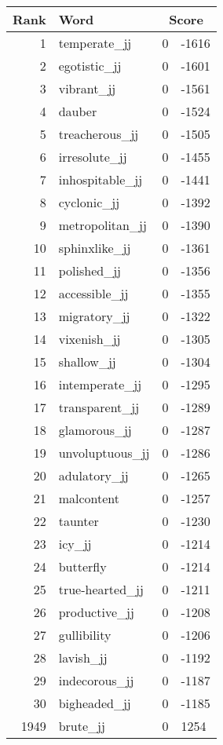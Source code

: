 \begin{longtable}[!htbp]{| rlr@{.}l |}
    \hline
    \textbf{Rank} & \textbf{Word} & \multicolumn{2}{c|}{\textbf{Score}} \\
    \hline
    \endhead
    1 & temperate\_jj & 0 & -1616 \\
    2 & egotistic\_jj & 0 & -1601 \\
    3 & vibrant\_jj & 0 & -1561 \\
    4 & dauber & 0 & -1524 \\
    5 & treacherous\_jj & 0 & -1505 \\
    6 & irresolute\_jj & 0 & -1455 \\
    7 & inhospitable\_jj & 0 & -1441 \\
    8 & cyclonic\_jj & 0 & -1392 \\
    9 & metropolitan\_jj & 0 & -1390 \\
    10 & sphinxlike\_jj & 0 & -1361 \\
    11 & polished\_jj & 0 & -1356 \\
    12 & accessible\_jj & 0 & -1355 \\
    13 & migratory\_jj & 0 & -1322 \\
    14 & vixenish\_jj & 0 & -1305 \\
    15 & shallow\_jj & 0 & -1304 \\
    16 & intemperate\_jj & 0 & -1295 \\
    17 & transparent\_jj & 0 & -1289 \\
    18 & glamorous\_jj & 0 & -1287 \\
    19 & unvoluptuous\_jj & 0 & -1286 \\
    20 & adulatory\_jj & 0 & -1265 \\
    21 & malcontent & 0 & -1257 \\
    22 & taunter & 0 & -1230 \\
    23 & icy\_jj & 0 & -1214 \\
    24 & butterfly & 0 & -1214 \\
    25 & true-hearted\_jj & 0 & -1211 \\
    26 & productive\_jj & 0 & -1208 \\
    27 & gullibility & 0 & -1206 \\
    28 & lavish\_jj & 0 & -1192 \\
    29 & indecorous\_jj & 0 & -1187 \\
    30 & bigheaded\_jj & 0 & -1185 \\
    1949 & brute\_jj & 0 & 1254 \\

\end{longtable}
